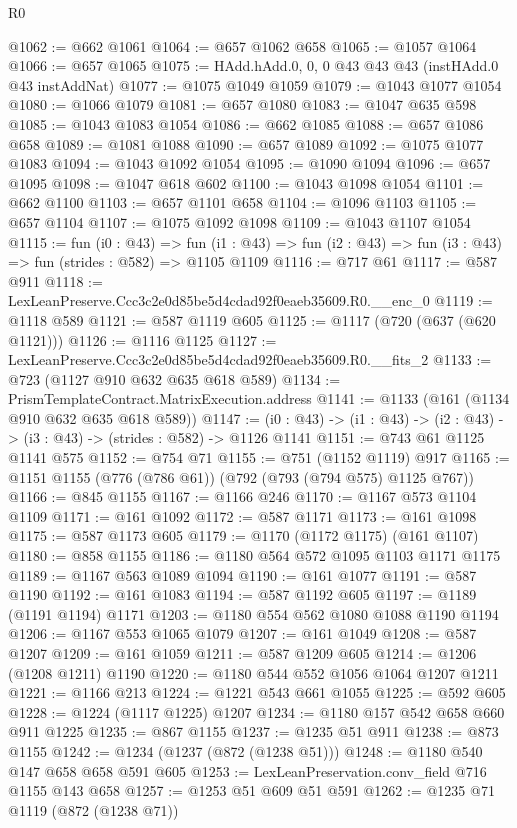 \begin{lexlean}{R0}
\begin{coremodule}
@1062 := @662 @1061
@1064 := @657 @1062 @658
@1065 := @1057 @1064
@1066 := @657 @1065
@1075 := HAdd.hAdd.{0, 0, 0} @43 @43 @43 (instHAdd.{0} @43 instAddNat)
@1077 := @1075 @1049 @1059
@1079 := @1043 @1077 @1054
@1080 := @1066 @1079
@1081 := @657 @1080
@1083 := @1047 @635 @598
@1085 := @1043 @1083 @1054
@1086 := @662 @1085
@1088 := @657 @1086 @658
@1089 := @1081 @1088
@1090 := @657 @1089
@1092 := @1075 @1077 @1083
@1094 := @1043 @1092 @1054
@1095 := @1090 @1094
@1096 := @657 @1095
@1098 := @1047 @618 @602
@1100 := @1043 @1098 @1054
@1101 := @662 @1100
@1103 := @657 @1101 @658
@1104 := @1096 @1103
@1105 := @657 @1104
@1107 := @1075 @1092 @1098
@1109 := @1043 @1107 @1054
@1115 := fun (i0 : @43) =>
  fun (i1 : @43) => fun (i2 : @43) => fun (i3 : @43) => fun (strides : @582) => @1105 @1109
@1116 := @717 @61
@1117 := @587 @911
@1118 := LexLeanPreserve.Ccc3c2e0d85be5d4cdad92f0eaeb35609.R0.__enc_0
@1119 := @1118 @589
@1121 := @587 @1119 @605
@1125 := @1117 (@720 (@637 (@620 @1121)))
@1126 := @1116 @1125
@1127 := LexLeanPreserve.Ccc3c2e0d85be5d4cdad92f0eaeb35609.R0.__fits_2
@1133 := @723 (@1127 @910 @632 @635 @618 @589)
@1134 := PrismTemplateContract.MatrixExecution.address
@1141 := @1133 (@161 (@1134 @910 @632 @635 @618 @589))
@1147 := (i0 : @43) -> (i1 : @43) -> (i2 : @43) -> (i3 : @43) -> (strides : @582) -> @1126 @1141
@1151 := @743 @61 @1125 @1141 @575
@1152 := @754 @71
@1155 := @751 (@1152 @1119) @917
@1165 := @1151 @1155 (@776 (@786 @61)) (@792 (@793 (@794 @575) @1125 @767))
@1166 := @845 @1155
@1167 := @1166 @246
@1170 := @1167 @573 @1104 @1109
@1171 := @161 @1092
@1172 := @587 @1171
@1173 := @161 @1098
@1175 := @587 @1173 @605
@1179 := @1170 (@1172 @1175) (@161 @1107)
@1180 := @858 @1155
@1186 := @1180 @564 @572 @1095 @1103 @1171 @1175
@1189 := @1167 @563 @1089 @1094
@1190 := @161 @1077
@1191 := @587 @1190
@1192 := @161 @1083
@1194 := @587 @1192 @605
@1197 := @1189 (@1191 @1194) @1171
@1203 := @1180 @554 @562 @1080 @1088 @1190 @1194
@1206 := @1167 @553 @1065 @1079
@1207 := @161 @1049
@1208 := @587 @1207
@1209 := @161 @1059
@1211 := @587 @1209 @605
@1214 := @1206 (@1208 @1211) @1190
@1220 := @1180 @544 @552 @1056 @1064 @1207 @1211
@1221 := @1166 @213
@1224 := @1221 @543 @661 @1055
@1225 := @592 @605
@1228 := @1224 (@1117 @1225) @1207
@1234 := @1180 @157 @542 @658 @660 @911 @1225
@1235 := @867 @1155
@1237 := @1235 @51 @911
@1238 := @873 @1155
@1242 := @1234 (@1237 (@872 (@1238 @51)))
@1248 := @1180 @540 @147 @658 @658 @591 @605
@1253 := LexLeanPreservation.conv_field @716 @1155 @143 @658
@1257 := @1253 @51 @609 @51 @591
@1262 := @1235 @71 @1119 (@872 (@1238 @71))

\end{coremodule}
\end{lexlean}
